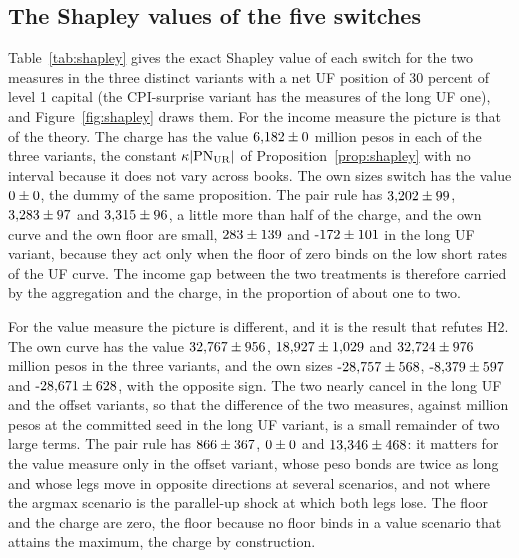 \subsection{The Shapley values of the five switches}
\label{sec:ablation-shapley}

Table~\ref{tab:shapley} gives the exact Shapley value of each switch for the two measures in the three distinct variants with a net UF position of 30 percent of level 1 capital (the CPI-surprise variant has the measures of the long UF one), and Figure~\ref{fig:shapley} draws them. For the income measure the picture is that of the theory. The charge has the value $6{,}182\pm0$ million pesos in each of the three variants, the constant $\kappa|\mathrm{PN}_{\mathrm{UR}}|$ of Proposition~\ref{prop:shapley} with no interval because it does not vary across books. The own sizes switch has the value $0\pm0$, the dummy of the same proposition. The pair rule has $3{,}202\pm99$, $3{,}283\pm97$ and $3{,}315\pm96$, a little more than half of the charge, and the own curve and the own floor are small, $283\pm139$ and $\mainShapNiiFloorLng\pm\mainShapNiiFloorLngCi$ in the long UF variant, because they act only when the floor of zero binds on the low short rates of the UF curve. The income gap between the two treatments is therefore carried by the aggregation and the charge, in the proportion of about one to two.



For the value measure the picture is different, and it is the result that refutes H2. The own curve has the value $32{,}767\pm956$, $18{,}927\pm1{,}029$ and $32{,}724\pm976$ million pesos in the three variants, and the own sizes $\mainShapEveSizesLng\pm\mainShapEveSizesLngCi$, $\mainShapEveSizesSht\pm\mainShapEveSizesShtCi$ and $\mainShapEveSizesOff\pm\mainShapEveSizesOffCi$, with the opposite sign. The two nearly cancel in the long UF and the offset variants, so that the difference of the two measures, \repAnnexEveLng{} against \repSingleEveLng{} million pesos at the committed seed in the long UF variant, is a small remainder of two large terms. The pair rule has $866\pm367$, $0\pm0$ and $13{,}346\pm468$: it matters for the value measure only in the offset variant, whose peso bonds are twice as long and whose legs move in opposite directions at several scenarios, and not where the argmax scenario is the parallel-up shock at which both legs lose. The floor and the charge are zero, the floor because no floor binds in a value scenario that attains the maximum, the charge by construction.

